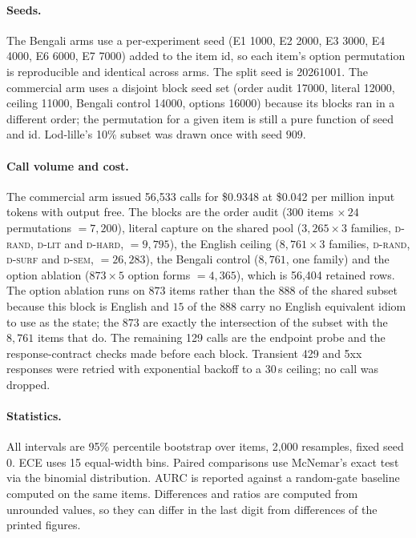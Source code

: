 \documentclass[11pt]{article}
\newcommand{\Drand}{\textsc{d-rand}}
\newcommand{\Dsurf}{\textsc{d-surf}}
\newcommand{\Dsem}{\textsc{d-sem}}
\newcommand{\Dlit}{\textsc{d-lit}}
\newcommand{\Dhard}{\textsc{d-hard}}
\begin{document}
\paragraph{Seeds.} The Bengali arms use a per-experiment seed (E1 1000, E2 2000,
E3 3000, E4 4000, E6 6000, E7 7000) added to the item id, so each item's option
permutation is reproducible and identical across arms. The split seed is
20261001. The commercial arm uses a disjoint block seed set (order audit 17000,
literal 12000, ceiling 11000, Bengali control 14000, options 16000) because its
blocks ran in a different order; the permutation for a given item is still a
pure function of seed and id. Lod-lille's 10\% subset was drawn once with seed
$909$.

\paragraph{Call volume and cost.} The commercial arm issued 56{,}533 calls for
\$0.9348 at \$0.042 per million input tokens with output free. The blocks are
the order audit ($300$ items $\times\,24$ permutations $= 7{,}200$), literal
capture on the shared pool ($3{,}265 \times 3$ families, \Drand, \Dlit{} and
\Dhard, $= 9{,}795$), the English ceiling ($8{,}761 \times 3$ families, \Drand,
\Dsurf{} and \Dsem, $= 26{,}283$), the Bengali control ($8{,}761$, one family) and
the option ablation ($873 \times 5$ option forms $= 4{,}365$), which is
56{,}404 retained rows. The option ablation runs on $873$ items rather than the
$888$ of the shared subset because this block is English and $15$ of the $888$
carry no English equivalent idiom to use as the state; the $873$ are exactly the
intersection of the subset with the $8{,}761$ items that do. The remaining 129 calls
are the endpoint probe and the response-contract checks made before each block.
Transient 429 and 5xx responses were retried with exponential backoff to a
30\,s ceiling; no call was dropped.

\paragraph{Statistics.} All intervals are 95\% percentile bootstrap over items,
2{,}000 resamples, fixed seed 0. ECE uses 15 equal-width bins. Paired
comparisons use McNemar's exact test via the binomial distribution. AURC is
reported against a random-gate baseline computed on the same items. Differences
and ratios are computed from unrounded values, so they can differ in the last digit
from differences of the printed figures.
\end{document}
